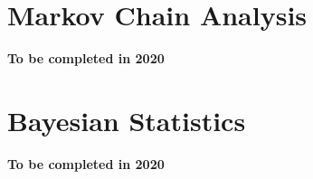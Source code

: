 

\section{Markov Chain Analysis}\label{apx:appendix1}
\textbf{To be completed in 2020}
%
%
%
%
%


\section{Bayesian Statistics}\label{apx:appendix2}
\textbf{To be completed in 2020}

%
